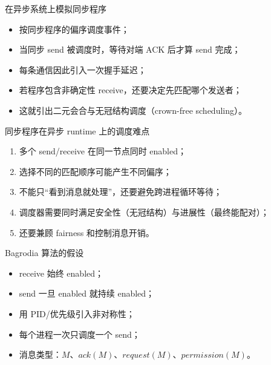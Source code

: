 \documentclass[UTF8,fontset=none,aspectratio=169,10pt]{beamer}
\begin{document}
{\begin{frame}{在异步系统上模拟同步程序}
\begin{itemize}
  \item 按同步程序的偏序调度事件；
  \item 当同步 send 被调度时，等待对端 ACK 后才算 send 完成；
  \item 每条通信因此引入一次握手延迟；
  \item 若程序包含非确定性 receive，还要决定先匹配哪个发送者；
  \item 这就引出二元会合与无冠结构调度（crown-free scheduling）。
\end{itemize}
\end{frame}

\begin{frame}{同步程序在异步 runtime 上的调度难点}
\begin{enumerate}
  \item 多个 send/receive 在同一节点同时 enabled；
  \item 选择不同的匹配顺序可能产生不同偏序；
  \item 不能只“看到消息就处理”，还要避免跨进程循环等待；
  \item 调度器需要同时满足安全性（无冠结构）与进展性（最终能配对）；
  \item 还要兼顾 fairness 和控制消息开销。
\end{enumerate}
\end{frame}


\begin{frame}{Bagrodia 算法的假设}
\begin{itemize}
  \item receive 始终 enabled；
  \item send 一旦 enabled 就持续 enabled；
  \item 用 PID/优先级引入非对称性；
  \item 每个进程一次只调度一个 send；
  \item 消息类型：$M$、$ack(M)$、$request(M)$、$permission(M)$。
\end{itemize}
\end{frame}

}
\end{document}
